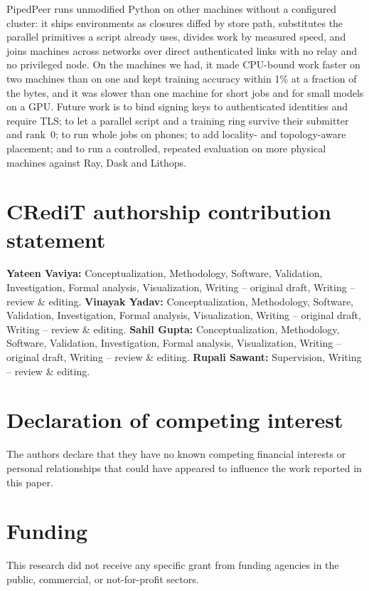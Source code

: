 \documentclass[5p,times,twocolumn]{elsarticle}
\begin{document}
PipedPeer runs unmodified Python on other machines without a configured
cluster: it ships environments as closures diffed by store path, substitutes
the parallel primitives a script already uses, divides work by measured speed,
and joins machines across networks over direct authenticated links with no
relay and no privileged node. On the machines we had, it made CPU-bound work
faster on two machines than on one and kept training accuracy within 1\% at a
fraction of the bytes, and it was slower than one machine for short jobs and
for small models on a GPU. Future work is to bind signing keys to
authenticated identities and require TLS; to let a parallel script and a
training ring survive their submitter and rank~0; to run whole jobs on phones;
to add locality- and topology-aware placement; and to run a controlled,
repeated evaluation on more physical machines against Ray, Dask and Lithops.

\section*{CRediT authorship contribution statement}
\textbf{Yateen Vaviya:} Conceptualization, Methodology, Software, Validation,
Investigation, Formal analysis, Visualization, Writing -- original draft,
Writing -- review \& editing.
\textbf{Vinayak Yadav:} Conceptualization, Methodology, Software, Validation,
Investigation, Formal analysis, Visualization, Writing -- original draft,
Writing -- review \& editing.
\textbf{Sahil Gupta:} Conceptualization, Methodology, Software, Validation,
Investigation, Formal analysis, Visualization, Writing -- original draft,
Writing -- review \& editing.
\textbf{Rupali Sawant:} Supervision, Writing -- review \& editing.

\section*{Declaration of competing interest}
The authors declare that they have no known competing financial interests or
personal relationships that could have appeared to influence the work reported
in this paper.

\section*{Funding}
This research did not receive any specific grant from funding agencies in the
public, commercial, or not-for-profit sectors.
\end{document}
